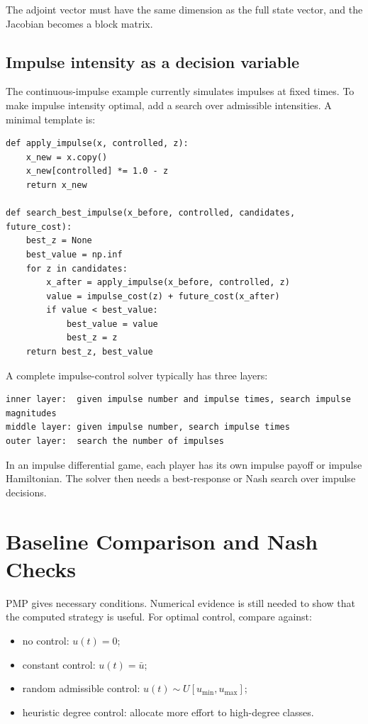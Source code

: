 \documentclass[11pt,a4paper]{article}
\begin{document}
The adjoint vector must have the same dimension as the full state vector, and the Jacobian becomes a block matrix.

\subsection{Impulse intensity as a decision variable}

The continuous-impulse example currently simulates impulses at fixed times. To make impulse intensity optimal, add a search over admissible intensities. A minimal template is:

\begin{lstlisting}[style=py]
def apply_impulse(x, controlled, z):
    x_new = x.copy()
    x_new[controlled] *= 1.0 - z
    return x_new

def search_best_impulse(x_before, controlled, candidates, future_cost):
    best_z = None
    best_value = np.inf
    for z in candidates:
        x_after = apply_impulse(x_before, controlled, z)
        value = impulse_cost(z) + future_cost(x_after)
        if value < best_value:
            best_value = value
            best_z = z
    return best_z, best_value
\end{lstlisting}

A complete impulse-control solver typically has three layers:

\begin{lstlisting}[style=text]
inner layer:  given impulse number and impulse times, search impulse magnitudes
middle layer: given impulse number, search impulse times
outer layer:  search the number of impulses
\end{lstlisting}

In an impulse differential game, each player has its own impulse payoff or impulse Hamiltonian. The solver then needs a best-response or Nash search over impulse decisions.

\section{Baseline Comparison and Nash Checks}

PMP gives necessary conditions. Numerical evidence is still needed to show that the computed strategy is useful. For optimal control, compare against:

\begin{itemize}
  \item no control: \(u(t)=0\);
  \item constant control: \(u(t)=\bar u\);
  \item random admissible control: \(u(t)\sim U[u_{\min},u_{\max}]\);
  \item heuristic degree control: allocate more effort to high-degree classes.
\end{itemize}
\end{document}
